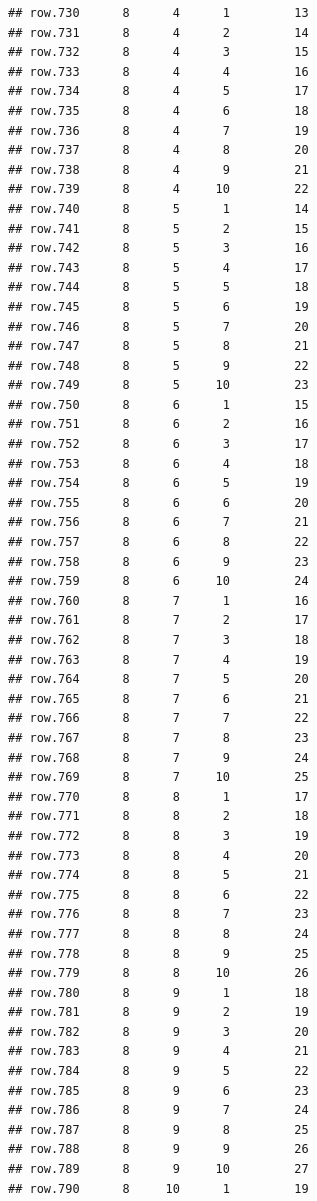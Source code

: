 \documentclass[
]{article}
\begin{document}
\begin{verbatim}
## row.730      8      4      1         13
## row.731      8      4      2         14
## row.732      8      4      3         15
## row.733      8      4      4         16
## row.734      8      4      5         17
## row.735      8      4      6         18
## row.736      8      4      7         19
## row.737      8      4      8         20
## row.738      8      4      9         21
## row.739      8      4     10         22
## row.740      8      5      1         14
## row.741      8      5      2         15
## row.742      8      5      3         16
## row.743      8      5      4         17
## row.744      8      5      5         18
## row.745      8      5      6         19
## row.746      8      5      7         20
## row.747      8      5      8         21
## row.748      8      5      9         22
## row.749      8      5     10         23
## row.750      8      6      1         15
## row.751      8      6      2         16
## row.752      8      6      3         17
## row.753      8      6      4         18
## row.754      8      6      5         19
## row.755      8      6      6         20
## row.756      8      6      7         21
## row.757      8      6      8         22
## row.758      8      6      9         23
## row.759      8      6     10         24
## row.760      8      7      1         16
## row.761      8      7      2         17
## row.762      8      7      3         18
## row.763      8      7      4         19
## row.764      8      7      5         20
## row.765      8      7      6         21
## row.766      8      7      7         22
## row.767      8      7      8         23
## row.768      8      7      9         24
## row.769      8      7     10         25
## row.770      8      8      1         17
## row.771      8      8      2         18
## row.772      8      8      3         19
## row.773      8      8      4         20
## row.774      8      8      5         21
## row.775      8      8      6         22
## row.776      8      8      7         23
## row.777      8      8      8         24
## row.778      8      8      9         25
## row.779      8      8     10         26
## row.780      8      9      1         18
## row.781      8      9      2         19
## row.782      8      9      3         20
## row.783      8      9      4         21
## row.784      8      9      5         22
## row.785      8      9      6         23
## row.786      8      9      7         24
## row.787      8      9      8         25
## row.788      8      9      9         26
## row.789      8      9     10         27
## row.790      8     10      1         19

\end{verbatim}
\end{document}
